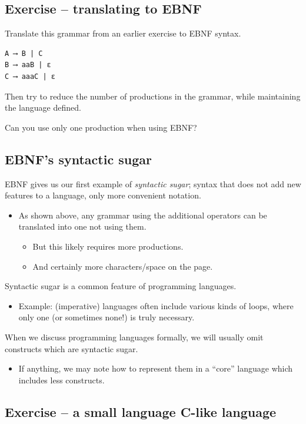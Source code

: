 \documentclass[11pt]{article}
\theoremstyle{definition}
\begin{document}
\subsection{Exercise – translating to EBNF}
\label{sec:orga95edfe}

Translate this grammar from an earlier exercise to EBNF syntax.
\begin{verbatim}
A ⟶ B | C
B ⟶ aaB | ε
C ⟶ aaaC | ε
\end{verbatim}
Then try to reduce the number of productions in the grammar,
while maintaining the language defined.

Can you use only one production when using EBNF?

\subsection{EBNF's syntactic sugar}
\label{sec:org43f90be}

EBNF gives us our first example of \emph{syntactic sugar};
syntax that does not add new features to a language,
only more convenient notation.
\begin{itemize}
\item As shown above, any grammar using the additional operators
can be translated into one not using them.
\begin{itemize}
\item But this likely requires more productions.
\item And certainly more characters/space on the page.
\end{itemize}
\end{itemize}

Syntactic sugar is a common feature of programming languages.
\begin{itemize}
\item Example: (imperative) languages often include various kinds of loops,
where only one (or sometimes none!) is truly necessary.
\end{itemize}

When we discuss programming languages formally,
we will usually omit constructs which are syntactic sugar.
\begin{itemize}
\item If anything, we may note how to represent them
in a “core” language which includes less constructs.
\end{itemize}

\subsection{Exercise – a small language C-like language}
\label{sec:orgf53ccec}
\end{document}
